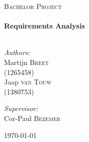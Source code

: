 \begin{titlepage}

\begin{center}



\textsc{\LARGE Bachelor Project }\\[1.5cm]


\HRule \\[0.4cm]
{ \huge \bfseries Requirements Analysis}\\[0.4cm]

\HRule \\[1.5cm]

\begin{minipage}{0.4\textwidth}
\begin{flushleft} \large
\emph{Authors:}\\
Martijn \textsc{Breet} \\ (1265458) \\ [0.1cm]
Jaap \textsc{van Touw} \\(1380753)\\ [0.1cm]
\end{flushleft}
\end{minipage}
\begin{minipage}{0.4\textwidth}
\begin{flushright} \large
\emph{Supervisor:} \\
Cor-Paul \textsc{Bezemer}
\end{flushright}
\end{minipage}

\vfill

{\large \today}

\end{center}

\end{titlepage}
